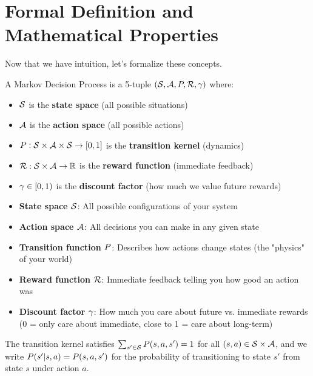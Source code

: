 \section{Formal Definition and Mathematical Properties}

Now that we have intuition, let's formalize these concepts.

\begin{definition}
A Markov Decision Process is a 5-tuple $(\mathcal{S}, \mathcal{A}, P, \mathcal{R}, \gamma)$ where:
\begin{itemize}
    \item $\mathcal{S}$ is the \textbf{state space} (all possible situations)
    \item $\mathcal{A}$ is the \textbf{action space} (all possible actions)
    \item $P: \mathcal{S} \times \mathcal{A} \times \mathcal{S} \to [0,1]$ is the \textbf{transition kernel} (dynamics)
    \item $\mathcal{R}: \mathcal{S} \times \mathcal{A} \to \mathbb{R}$ is the \textbf{reward function} (immediate feedback)
    \item $\gamma \in [0,1)$ is the \textbf{discount factor} (how much we value future rewards)
\end{itemize}
\end{definition}

\begin{intuitionbox}
\begin{itemize}
    \item \textbf{State space $\mathcal{S}$}: All possible configurations of your system
    \item \textbf{Action space $\mathcal{A}$}: All decisions you can make in any given state
    \item \textbf{Transition function $P$}: Describes how actions change states (the "physics" of your world)
    \item \textbf{Reward function $\mathcal{R}$}: Immediate feedback telling you how good an action was
    \item \textbf{Discount factor $\gamma$}: How much you care about future vs. immediate rewards (0 = only care about immediate, close to 1 = care about long-term)
\end{itemize}
\end{intuitionbox}

The transition kernel satisfies $\sum_{s' \in \mathcal{S}} P(s,a,s') = 1$ for all $(s,a) \in \mathcal{S} \times \mathcal{A}$, and we write $P(s'|s,a) = P(s,a,s')$ for the probability of transitioning to state $s'$ from state $s$ under action $a$.

